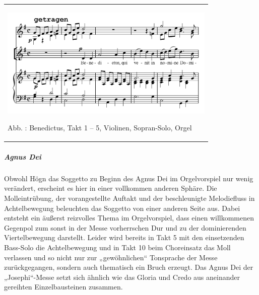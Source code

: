 \begin{flushleft}
\tablefirsthead{}
\tablehead{}
\tabletail{}
\tablelasttail{}
\begin{supertabular}{m{10.528cm}}

\includegraphics[width=10.345cm,height=5.313cm]{pictures/zulassungsarbeit-img122.png}

Abb. : Benedictus, Takt 1 – 5, Violinen,
Sopran-Solo, Orgel\\
\end{supertabular}
\end{flushleft}
\clearpage\subparagraph{Agnus Dei}
Obwohl Högn das Soggetto zu Beginn des Agnus Dei im Orgelvorspiel nur
wenig verändert, erscheint es hier in einer vollkommen anderen Sphäre.
Die Molleintrübung, der vorangestellte Auftakt und der beschleunigte
Melodiefluss in Achtelbewegung beleuchten das Soggetto von einer
anderen Seite aus. Dabei entsteht ein äußerst reizvolles Thema im
Orgelvorspiel, dass einen willkommenen Gegenpol zum sonst in der Messe
vorherrschen Dur und zu der dominierenden Viertelbewegung darstellt.
Leider wird bereits in Takt 5 mit den einsetzenden Bass-Solo die
Achtelbewegung und in Takt 10 beim Choreinsatz das Moll verlassen und
so nicht nur zur „gewöhnlichen“ Tonsprache der Messe zurückgegangen,
sondern auch thematisch ein Bruch erzeugt. Das Agnus Dei der
„Josephi“-Messe setzt sich ähnlich wie das Gloria und Credo aus
aneinander gereihten Einzelbausteinen zusammen.

